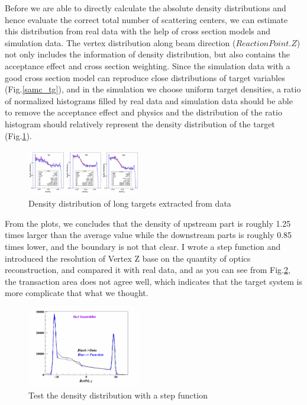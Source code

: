 \documentclass[a4paper,10.5pt]{report}
\begin{document}
Before we are able to directly calculate the absolute density distributions and hence evaluate the correct total number of scattering centers, we can estimate this distribution from real data with the help of cross section models and simulation data. The vertex distribution along beam direction ($ReactionPoint.Z$) not only includes the information of density distribution, but also contains the acceptance effect and cross section weighting. Since the simulation data with a good cross section model can reproduce close distributions of target variables (Fig.\ref{samc_tg}), and in the simulation we choose uniform target densities, a ratio of normalized histograms filled by real data and simulation data should be able to remove the acceptance effect and physics and the distribution of the ratio histogram should relatively represent the density distribution of the target (Fig.\ref{long_target_dis}).

\begin{figure}[ht]
 \begin{center}
  \includegraphics[type=pdf, ext=.pdf,read=.pdf,width=0.44\textwidth]{../figures/target/Target_Bump_Fit}
  \caption[Density distribution of long targets extracted from data]{Density distribution of long targets extracted from data}
  \label{long_target_dis}
 \end{center}
\end{figure}

 From the plots, we concludes that the density of upstream part is roughly 1.25 times larger than the average value while the downstream parts is roughly 0.85 times lower, and the boundary is not that clear. I wrote a step function and introduced the resolution of Vertex Z base on the quantity of optics reconstruction, and compared it with real data, and as you can see from Fig.\ref{long_target_step}, the transaction area does not agree well, which indicates that the target system is more complicate that what we thought.

\begin{figure}[ht]
 \begin{center}
  \includegraphics[type=pdf, ext=.pdf,read=.pdf,width=0.44\textwidth]{../figures/target/VZ_Com_True_Resol}
  \caption[Test the density distribution with a step function]{Test the density distribution with a step function}
  \label{long_target_step}
 \end{center}
\end{figure}
\end{document}
